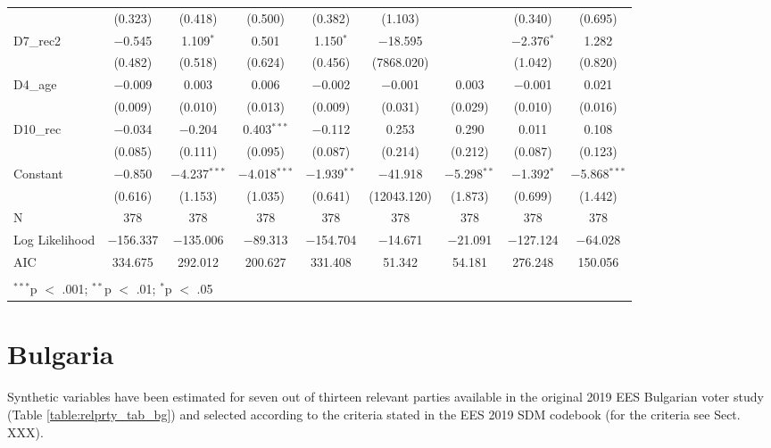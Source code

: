 \documentclass[
]{article}
\begin{document}
\begin{table}[!htbp]
\begin{tabular}{@{\extracolsep{0.5pt}}lcccccccc}
  & (0.323) & (0.418) & (0.500) & (0.382) & (1.103) &  & (0.340) & (0.695) \\ 
  D7\_rec2 & $-$0.545 & 1.109$^{*}$ & 0.501 & 1.150$^{*}$ & $-$18.595 &  & $-$2.376$^{*}$ & 1.282 \\ 
  & (0.482) & (0.518) & (0.624) & (0.456) & (7868.020) &  & (1.042) & (0.820) \\ 
  D4\_age & $-$0.009 & 0.003 & 0.006 & $-$0.002 & $-$0.001 & 0.003 & $-$0.001 & 0.021 \\ 
  & (0.009) & (0.010) & (0.013) & (0.009) & (0.031) & (0.029) & (0.010) & (0.016) \\ 
  D10\_rec & $-$0.034 & $-$0.204 & 0.403$^{***}$ & $-$0.112 & 0.253 & 0.290 & 0.011 & 0.108 \\ 
  & (0.085) & (0.111) & (0.095) & (0.087) & (0.214) & (0.212) & (0.087) & (0.123) \\ 
  Constant & $-$0.850 & $-$4.237$^{***}$ & $-$4.018$^{***}$ & $-$1.939$^{**}$ & $-$41.918 & $-$5.298$^{**}$ & $-$1.392$^{*}$ & $-$5.868$^{***}$ \\ 
  & (0.616) & (1.153) & (1.035) & (0.641) & (12043.120) & (1.873) & (0.699) & (1.442) \\ 
 N & 378 & 378 & 378 & 378 & 378 & 378 & 378 & 378 \\ 
Log Likelihood & $-$156.337 & $-$135.006 & $-$89.313 & $-$154.704 & $-$14.671 & $-$21.091 & $-$127.124 & $-$64.028 \\ 
AIC & 334.675 & 292.012 & 200.627 & 331.408 & 51.342 & 54.181 & 276.248 & 150.056 \\ 
\hline \\[-1.8ex] 
\multicolumn{9}{l}{$^{***}$p $<$ .001; $^{**}$p $<$ .01; $^{*}$p $<$ .05} \\ 
\end{tabular} 
\end{table}

\clearpage

\newpage

\hypertarget{bulgaria}{%
\section{Bulgaria}\label{bulgaria}}

Synthetic variables have been estimated for seven out of thirteen relevant parties available in the original
2019 EES Bulgarian voter study (Table \ref{table:relprty_tab_bg}) and selected according to the criteria
stated in the EES 2019 SDM codebook (for the criteria see Sect. XXX).
\end{document}
